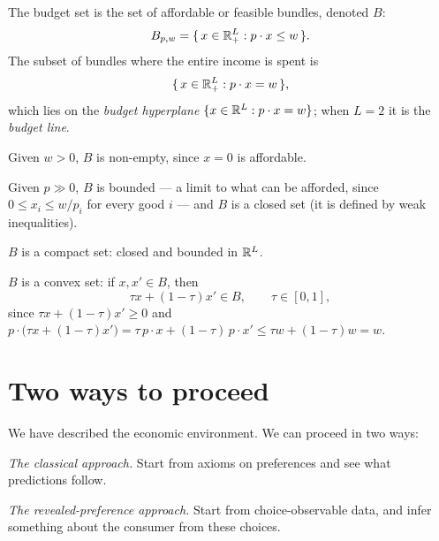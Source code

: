 \documentclass[11pt]{article}
\begin{document}
The budget set is the set of affordable or feasible bundles, denoted $B$:
\[ B_{p,w}=\{\,x\in\mathbb{R}^L_+ : p\cdot x\le w\,\}. \]
The subset of bundles where the entire income is spent is
\[ \{\,x\in\mathbb{R}^L_+ : p\cdot x=w\,\}, \]
which lies on the \emph{budget hyperplane} $\{x\in\mathbb{R}^L : p\cdot x=w\}$; when
$L=2$ it is the \emph{budget line}.

\begin{flatlist}
  \item Given $w>0$, $B$ is non-empty, since $x=0$ is affordable.
  \item Given $p\gg 0$, $B$ is bounded --- a limit to what can be afforded, since
        $0\le x_i\le w/p_i$ for every good $i$ --- and $B$ is a closed set (it is
        defined by weak inequalities).
  \item $B$ is a compact set: closed and bounded in $\mathbb{R}^L$.
  \item $B$ is a convex set: if $x,x'\in B$, then
        \[ \tau x+(1-\tau)x'\in B,\qquad \tau\in[0,1], \]
        since $\tau x+(1-\tau)x'\ge0$ and
        $p\cdot\bigl(\tau x+(1-\tau)x'\bigr)=\tau\,p\cdot x+(1-\tau)\,p\cdot x'\le
        \tau w+(1-\tau)w=w$.
\end{flatlist}

\section{Two ways to proceed}

We have described the economic environment. We can proceed in two ways:

\begin{flatlist}
  \item \emph{The classical approach.} Start from axioms on preferences and see
        what predictions follow.
  \item \emph{The revealed-preference approach.} Start from choice-observable
        data, and infer something about the consumer from these choices.
\end{flatlist}
\end{document}

